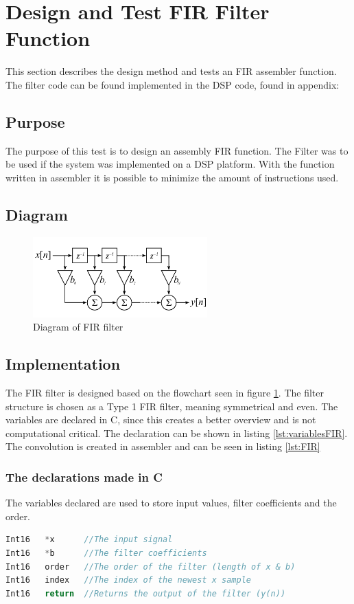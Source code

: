 \section{Design and Test FIR Filter Function}

This section describes the design method and tests an FIR assembler function. The filter code can be found implemented in the DSP code, found in appendix: \


\subsection{Purpose}
The purpose of this test is to design an assembly FIR function. The Filter was to be used if the system was implemented on a DSP platform. With the function written in assembler it is possible to minimize the amount of instructions used. 


\subsection{Diagram}

\begin{figure}[H]
	\centering
	\includegraphics[width=0.6\textwidth]{../Journal/Code/FIRfilter}
	\caption{Diagram of FIR filter\cite{FIRWiki}}
	\label{Fig:FIR_filter2}
\end{figure}

\subsection{Implementation}
The FIR filter is designed based on the flowchart seen in figure \ref{Fig:FIR_filter2}. The filter structure is chosen as a Type 1 FIR filter, meaning symmetrical and even. The variables are declared in C, since this creates a better overview and is not computational critical. The declaration can be shown in listing \ref{lst:variablesFIR}. The convolution is created in assembler and can be seen in listing \ref{lst:FIR}

\subsubsection{The declarations made in C}
The variables declared are used to store input values, filter coefficients and the order. 
\begin{lstlisting}[language={C},caption={declaration of the needed variables}, label={lst:variablesFIR} ]
Int16 	*x 		//The input signal
Int16	*b		//The filter coefficients
Int16	order	//The order of the filter (length of x & b)
Int16	index	//The index of the newest x sample
Int16	return	//Returns the output of the filter (y(n))
\end{lstlisting}


